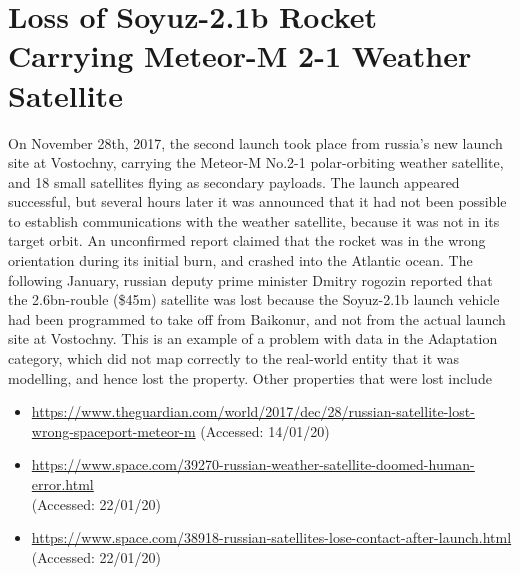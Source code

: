 \section{Loss of Soyuz-2.1b Rocket Carrying Meteor-M 2-1 Weather Satellite} \label{bkm:incacc:soyuz}
On November 28th, 2017, the second launch took place from russia's new launch site at Vostochny, carrying the Meteor-M No.2-1 polar-orbiting weather satellite, and 18 small satellites flying as secondary payloads. The launch appeared successful, but several hours later it was announced that it had not been possible to establish communications with the weather satellite, because it was not in its target orbit. An unconfirmed report claimed that the rocket was in the wrong orientation during its initial burn, and crashed into the Atlantic ocean.
The following January, russian deputy prime minister Dmitry rogozin reported that the 2.6bn-rouble (\$45m) satellite was lost because the Soyuz-2.1b launch vehicle had been programmed to take off from Baikonur, and not from the actual launch site at Vostochny. 
This is an example of a problem with data in the Adaptation category, which did not map correctly to the real-world entity that it was modelling, and hence lost the  property. Other properties that were lost include 

\begin{itemize}
  \item \raggedright{\href{https://www.theguardian.com/world/2017/dec/28/russian-satellite-lost-wrong-spaceport-meteor-m}{https://www.theguardian.com/world/2017/dec/28/russian-satellite-lost-wrong-spaceport-meteor-m} (Accessed: 14/01/20)}
  \item \raggedright{\href{https://www.space.com/39270-russian-weather-satellite-doomed-human-error.html}{https://www.space.com/39270-russian-weather-satellite-doomed-human-error.html} \\(Accessed: 22/01/20)}
  \item \raggedright{\href{https://www.space.com/38918-russian-satellites-lose-contact-after-launch.html}{https://www.space.com/38918-russian-satellites-lose-contact-after-launch.html} \\(Accessed: 22/01/20)}
\end{itemize}
%
%
